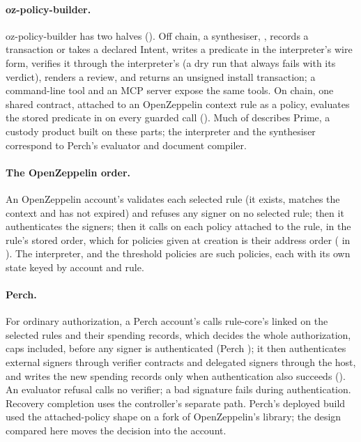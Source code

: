 \paragraph{oz-policy-builder.} oz-policy-builder has two halves
(). Off chain, a synthesiser,
, records a transaction or takes a declared
Intent, writes a predicate in the interpreter's wire form, verifies it through the
interpreter's  (a dry run that always fails with its verdict),
renders a review, and returns an unsigned install transaction; a command-line
tool and an MCP server expose the same  tools. On chain, one
shared  contract, attached to an OpenZeppelin context
rule as a policy, evaluates the stored predicate in  on every
guarded call (). Much of
 describes Prime, a custody product built on these parts;
the interpreter and the synthesiser correspond to Perch's evaluator and document
compiler.

\paragraph{The OpenZeppelin order.} An OpenZeppelin  account's
 validates each selected rule (it exists, matches the
context and has not expired) and refuses any signer on no selected rule; then it
authenticates the signers; then it calls  on each policy attached
to the rule, in the rule's stored order, which for policies given at creation is
their address order ( in ). The
interpreter,  and the threshold policies are such policies,
each with its own state keyed by account and rule.

\paragraph{Perch.} For ordinary authorization, a Perch account's
 calls rule-core's
linked \allowbreak{} on the selected rules and their spending
records, which decides the whole authorization, caps included, before any signer
is authenticated (Perch ); it then authenticates external
signers through verifier contracts and delegated signers through the host, and
writes the new spending records only when authentication also succeeds
(). An evaluator refusal calls no verifier; a bad
signature fails during authentication. Recovery completion uses the controller's
separate path. Perch's deployed build  used the
attached-policy shape on a fork of OpenZeppelin's library; the design compared
here moves the decision into the account.

